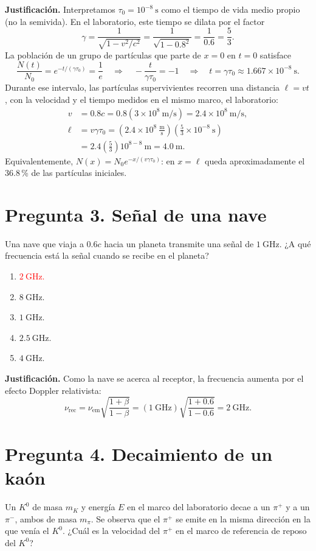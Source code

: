 \documentclass[a4paper,11pt]{article}
\newcommand{\pregunta}[2]{\section*{Pregunta #1. #2}}
\begin{document}
\textbf{Justificación.} Interpretamos $\tau_0=10^{-8}\ \mathrm{s}$ como el tiempo de vida medio propio (no la semivida). En el laboratorio, este tiempo se dilata por el factor
\[
\gamma=\frac{1}{\sqrt{1-v^2/c^2}}
=\frac{1}{\sqrt{1-0.8^2}}=\frac{1}{0.6}=\frac53.
\]
La población de un grupo de partículas que parte de $x=0$ en $t=0$ satisface
\[
\frac{N(t)}{N_0}=e^{-t/(\gamma\tau_0)}=\frac1e
\quad\Longrightarrow\quad
-\frac{t}{\gamma\tau_0}=-1
\quad\Longrightarrow\quad
 t=\gamma\tau_0\approx1.667\times10^{-8}\ \mathrm{s}.
\]
Durante ese intervalo, las partículas supervivientes recorren una distancia $\ell=vt$, con la velocidad y el tiempo medidos en el mismo marco, el laboratorio:
\[
\begin{aligned}
v&=0.8c=0.8(3\times10^8\ \mathrm{m/s})=2.4\times10^8\ \mathrm{m/s},\\
\ell&=v\gamma\tau_0
=\left(2.4\times10^8\ \frac{\mathrm{m}}{\mathrm{s}}\right)
\left(\frac53\times10^{-8}\ \mathrm{s}\right)\\
&=2.4\left(\frac53\right)10^{8-8}\ \mathrm{m}
=\boxed{4.0\ \mathrm{m}}.
\end{aligned}
\]
Equivalentemente, $N(x)=N_0e^{-x/(v\gamma\tau_0)}$: en $x=\ell$ queda aproximadamente el $36.8$\,\% de las partículas iniciales.

\pregunta{3}{Señal de una nave}

Una nave que viaja a $0.6c$ hacia un planeta transmite una señal de $1\ \mathrm{GHz}$. ¿A qué frecuencia está la señal cuando se recibe en el planeta?

\begin{enumerate}
    \item \textcolor{red}{$2\ \mathrm{GHz}$.}
    \item $8\ \mathrm{GHz}$.
    \item $1\ \mathrm{GHz}$.
    \item $2.5\ \mathrm{GHz}$.
    \item $4\ \mathrm{GHz}$.
\end{enumerate}

\textbf{Justificación.} Como la nave se acerca al receptor, la frecuencia aumenta por el efecto Doppler relativista:
\[
\nu_{\mathrm{rec}}=\nu_{\mathrm{em}}\sqrt{\frac{1+\beta}{1-\beta}}
=(1\ \mathrm{GHz})\sqrt{\frac{1+0.6}{1-0.6}}
=2\ \mathrm{GHz}.
\]

\pregunta{4}{Decaimiento de un kaón}

Un $K^0$ de masa $m_K$ y energía $E$ en el marco del laboratorio decae a un $\pi^+$ y a un $\pi^-$, ambos de masa $m_\pi$. Se observa que el $\pi^+$ se emite en la misma dirección en la que venía el $K^0$. ¿Cuál es la velocidad del $\pi^+$ en el marco de referencia de reposo del $K^0$?
\end{document}
